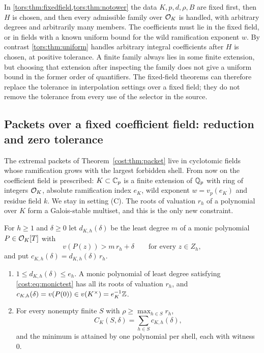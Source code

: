 \begin{remark}\label{tors:rem:quantifiers}
In \cref{tors:thm:fixedfield,tors:thm:notower} the data $K,p,d,\rho,B$ are fixed first,
then $H$ is chosen, and then every admissible family over $\mathcal{O}_K$ is handled, with
arbitrary degrees and arbitrarily many members. The coefficients must lie in the fixed
field, or in fields with a known uniform bound for the wild ramification exponent $w$.
By contrast \cref{tors:thm:uniform} handles arbitrary integral coefficients after $H$ is
chosen, at positive tolerance. A finite family always lies in some finite extension, but
choosing that extension after inspecting the family does not give a uniform bound in the
former order of quantifiers. The fixed-field theorems can therefore replace the
tolerance in interpolation settings over a fixed field; they do not remove the tolerance
from every use of the selector in the source.
\end{remark}

\subsection{Packets over a fixed coefficient field: reduction and zero tolerance}\label{cost:sec:fields}
{\raggedright{}}

The extremal packets of Theorem~\ref{cost:thm:packet} live in cyclotomic fields whose ramification
grows with the largest forbidden shell. From now on the coefficient field is prescribed:
$K\subset\mathbb{C}_p$ is a finite extension of $\mathbb{Q}_p$ with ring of integers $\mathcal{O}_K$, absolute
ramification index $e_K$, wild exponent $w=v_p(e_K)$ and residue field $k$. We stay in
setting (C). The roots of valuation $r_h$ of a polynomial over $K$ form a Galois-stable
multiset, and this is the only new constraint.

\begin{proposition}\label{cost:prop:monic}
For $h\ge1$ and $\delta\ge0$ let $d_{K,h}(\delta)$ be the least degree $m$ of a monic
polynomial $P\in\mathcal{O}_K[T]$ with
\begin{equation}\label{cost:eq:monictest}
 v(P(z))>m\,r_h+\delta\qquad\text{for every }z\in Z_h,
\end{equation}
and put $c_{K,h}(\delta)=d_{K,h}(\delta)\,r_h$.
\begin{enumerate}[label=\textup{(\roman*)}]
\item $1\le d_{K,h}(\delta)\le e_h$. A monic polynomial of least degree satisfying
\eqref{cost:eq:monictest} has all its roots of valuation $r_h$, and
$c_{K,h}(\delta)=v(P(0))\in v(K^\times)=e_K^{-1}\mathbb{Z}$.
\item For every nonempty finite $S$ with $\rho\ge\max_{h\in S}r_h$,
\[
 C_K(S,\delta)=\sum_{h\in S}c_{K,h}(\delta),
\]
and the minimum is attained by one polynomial per shell, each with witness $0$.
\end{enumerate}
\end{proposition}

